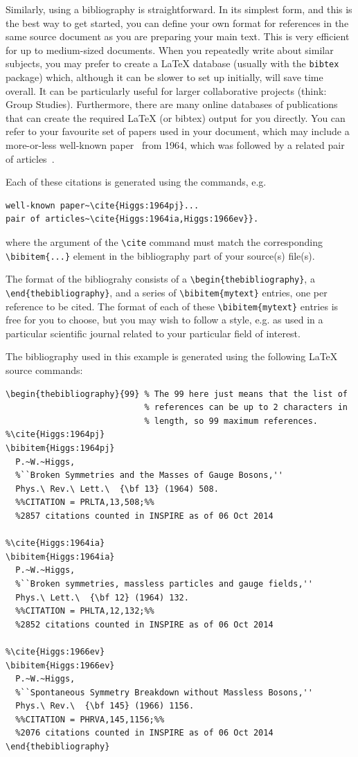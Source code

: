 \documentclass[a4paper,12pt]{article}
\begin{document}
Similarly, using a bibliography is straightforward. In its simplest
form, and this is the best way to get started, you can define your own
format for references in the same source document as you are
preparing your main text.  This is very efficient for up to
medium-sized documents.  When you repeatedly write about similar
subjects, you may prefer to create a LaTeX database (usually with the
\verb+bibtex+ package) which, although it can be slower to set up
initially, will save time overall.  It can be particularly useful for
larger collaborative projects (think: Group Studies).  Furthermore,
there are many online databases of publications that can create the
required LaTeX (or bibtex) output for you directly.  You can refer to
your favourite set of papers used in your document, which may include
a more-or-less well-known paper~\cite{Higgs:1964pj} from 1964, which was
followed by a related pair of articles~\cite{Higgs:1964ia,Higgs:1966ev}.

Each of these citations is generated using the commands, e.g.
\begin{verbatim}
well-known paper~\cite{Higgs:1964pj}...
pair of articles~\cite{Higgs:1964ia,Higgs:1966ev}}.
\end{verbatim}
where the argument of the \verb+\cite+ command must match the
corresponding \verb+\bibitem{...}+ element in the bibliography part of
your source(s) file(s).

The format of the bibliograhy consists of a
\verb+\begin{thebibliography}+, a \verb+\end{thebibliography}+, and a
series of \verb+\bibitem{mytext}+ entries, one per reference to be
cited. The format of each of these \verb+\bibitem{mytext}+ entries is
free for you to choose, but you may wish to follow a style, e.g. as
used in a particular scientific journal related to your particular
field of interest.

The bibliography used in this example is generated using the following
LaTeX source commands:
\begin{verbatim}
\begin{thebibliography}{99} % The 99 here just means that the list of
                            % references can be up to 2 characters in
                            % length, so 99 maximum references.
%\cite{Higgs:1964pj}
\bibitem{Higgs:1964pj}
  P.~W.~Higgs,
  %``Broken Symmetries and the Masses of Gauge Bosons,''
  Phys.\ Rev.\ Lett.\  {\bf 13} (1964) 508.
  %%CITATION = PRLTA,13,508;%%
  %2857 citations counted in INSPIRE as of 06 Oct 2014

%\cite{Higgs:1964ia}
\bibitem{Higgs:1964ia}
  P.~W.~Higgs,
  %``Broken symmetries, massless particles and gauge fields,''
  Phys.\ Lett.\  {\bf 12} (1964) 132.
  %%CITATION = PHLTA,12,132;%%
  %2852 citations counted in INSPIRE as of 06 Oct 2014

%\cite{Higgs:1966ev}
\bibitem{Higgs:1966ev}
  P.~W.~Higgs,
  %``Spontaneous Symmetry Breakdown without Massless Bosons,''
  Phys.\ Rev.\  {\bf 145} (1966) 1156.
  %%CITATION = PHRVA,145,1156;%%
  %2076 citations counted in INSPIRE as of 06 Oct 2014
\end{thebibliography}
\end{verbatim}
\end{document}
